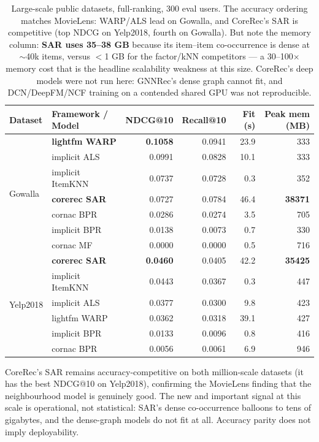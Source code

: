 \documentclass[10pt]{article}
\begin{document}
\begin{table}[h]\centering\small
\begin{tabular}{llrrrr}
\toprule
Dataset & Framework / Model & NDCG@10 & Recall@10 & Fit (s) & Peak mem (MB) \\
\midrule
\multirow{7}{*}{Gowalla}
 & \textbf{lightfm WARP}    & \textbf{0.1058} & 0.0941 & 23.9 & 333 \\
 & implicit ALS             & 0.0991 & 0.0828 & 10.1 & 333 \\
 & implicit ItemKNN         & 0.0737 & 0.0728 & 0.3 & 352 \\
 & \textbf{corerec SAR}     & 0.0727 & 0.0784 & 46.4 & \textbf{38371} \\
 & cornac BPR               & 0.0286 & 0.0274 & 3.5 & 705 \\
 & implicit BPR             & 0.0138 & 0.0073 & 0.7 & 330 \\
 & cornac MF                & 0.0000 & 0.0000 & 0.5 & 716 \\
\midrule
\multirow{6}{*}{Yelp2018}
 & \textbf{corerec SAR}     & \textbf{0.0460} & 0.0405 & 42.2 & \textbf{35425} \\
 & implicit ItemKNN         & 0.0443 & 0.0367 & 0.3 & 447 \\
 & implicit ALS             & 0.0377 & 0.0300 & 9.8 & 423 \\
 & lightfm WARP             & 0.0362 & 0.0318 & 39.1 & 427 \\
 & implicit BPR             & 0.0133 & 0.0096 & 0.8 & 416 \\
 & cornac BPR               & 0.0056 & 0.0061 & 6.9 & 946 \\
\bottomrule
\end{tabular}
\caption{Large-scale public datasets, full-ranking, 300 eval users. The accuracy
ordering matches MovieLens: WARP/ALS lead on Gowalla, and CoreRec's SAR is
competitive (top NDCG on Yelp2018, fourth on Gowalla). But note the memory
column: \textbf{SAR uses 35--38 GB} because its item--item co-occurrence is dense
at $\sim$40k items, versus $<$1 GB for the factor/kNN competitors --- a 30--100$\times$
memory cost that is the headline scalability weakness at this size. CoreRec's deep
models were not run here: GNNRec's dense graph cannot fit, and DCN/DeepFM/NCF
training on a contended shared GPU was not reproducible.}
\label{tab:datasets}
\end{table}

CoreRec's SAR remains accuracy-competitive on both million-scale datasets (it has
the best NDCG@10 on Yelp2018), confirming the MovieLens finding that the
neighbourhood model is genuinely good. The new and important signal at this scale
is operational, not statistical: SAR's dense co-occurrence balloons to tens of
gigabytes, and the dense-graph models do not fit at all. Accuracy parity does not
imply deployability.
\end{document}

